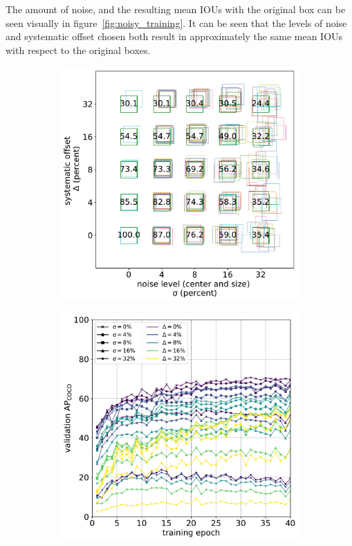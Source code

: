 The amount of noise, and the resulting mean \gls{IOU}s with the original box can be seen visually in figure~\ref{fig:noisy_training}. It can be seen that the levels of noise and systematic offset chosen both result in approximately the same mean \gls{IOU}s with respect to the original boxes.

\begin{figure}[ht!]
\centering
\begin{subfigure}[t]{0.5\linewidth}
  \includegraphics[width=1.0\linewidth]{charts/training/noisy_boxes.pdf}
  \caption{}
\end{subfigure}%
\begin{subfigure}[t]{0.5\linewidth}
  \includegraphics[width=1.0\linewidth]{charts/training/noisy_training.pdf}

\end{subfigure}
\end{figure}
